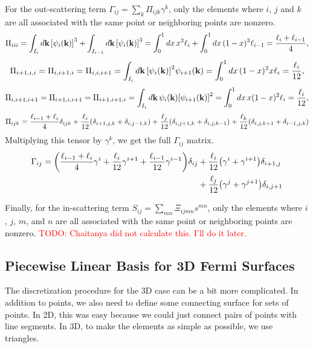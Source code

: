 \documentclass[12pt]{article}
\begin{document}
For the out-scattering term $\Gamma_{ij}=\sum_k\Pi_{ijk}\gamma^k$, only the elements where $i$, $j$ and $k$ are all
associated with the same point or neighboring points are nonzero.
\begin{equation}
    \Pi_{iii} = \int_{I_i} \dd{\vb{k}} \qty[\psi_i(\vb{k})]^3 + \int_{I_{i-1}}
        \dd{\vb{k}} \qty[\psi_i(\vb{k})]^3
    = \int_0^1 \dd{x} x^3 \ell_i + \int_0^1 \dd{x} (1-x)^3 \ell_{i-1}
    = \frac{\ell_i + \ell_{i-1}}{4},
\end{equation}
\begin{equation}
    \Pi_{i+1,i,i} = \Pi_{i,i+1,i} = \Pi_{i,i,i+1} = \int_{I_i} \dd{\vb{k}}
    \qty[\psi_i(\vb{k})]^2\psi_{i+1}(\vb{k}) = \int_0^1 \dd{x} (1-x)^2 x \ell_i = \frac{\ell_i}{12},
\end{equation}
\begin{equation}
    \Pi_{i,i+1,i+1} = \Pi_{i+1,i,i+1} = \Pi_{i+1,i+1,i} = \int_{I_i} \dd{\vb{k}}
    \psi_i(\vb{k})\qty[\psi_{i+1}(\vb{k})]^2 = \int_0^1 \dd{x} x(1-x)^2 \ell_i = \frac{\ell_i}{12},
\end{equation}
\begin{equation}
    \Pi_{ijk} = \frac{\ell_{i-1} + \ell_i}{4}\delta_{ijk}
    + \frac{\ell_i}{12}\qty(\delta_{i+1,j,k} + \delta_{i,j-1,k})
    + \frac{\ell_j}{12}\qty(\delta_{i,j+1,k} + \delta_{i,j,k-1})
    + \frac{\ell_k}{12}\qty(\delta_{i,j,k+1} + \delta_{i-1,j,k})
\end{equation}
Multiplying this tensor by $\gamma^k$, we get the full $\Gamma_{ij}$ matrix.
\begin{equation}
\begin{aligned}
    \Gamma_{ij} = \qty(\frac{\ell_{i-1} + \ell_i}{4}\gamma^i + \frac{\ell_i}{12}\gamma^{i+1}
        + \frac{\ell_{i-1}}{12}\gamma^{i-1})\delta_{ij}
    &+ \frac{\ell_i}{12}\qty(\gamma^i + \gamma^{i+1})\delta_{i+1,j} \\
    &+ \frac{\ell_j}{12}\qty(\gamma^j + \gamma^{j+1})\delta_{i,j+1}
\end{aligned}
\end{equation}

Finally, for the in-scattering term $S_{ij}=\sum_{mn}\Xi_{ijmn}s^{mn}$, only the elements where
$i$, $j$, $m$, and $n$ are all associated with the same point or neighboring points are nonzero. 
\textcolor{red}{TODO: Chaitanya did not calculate this. I'll do it later.}

\subsection{Piecewise Linear Basis for 3D Fermi Surfaces}
The discretization procedure for the 3D case can be a bit more complicated. In addition to points,
we also need to define some connecting surface for sets of points. In 2D, this was easy because we
could just connect pairs of points with line segments. In 3D, to make the elements as simple as
possible, we use triangles.
\end{document}
